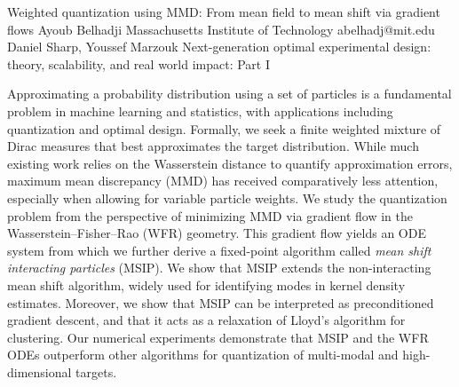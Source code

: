 \begin{talk}
  {Weighted quantization using MMD:
From mean field to mean shift via gradient flows}%
  {Ayoub Belhadji}%
  {Massachusetts Institute of Technology}%
  {abelhadj@mit.edu}%
  {Daniel Sharp, Youssef Marzouk}%
  {Next-generation optimal experimental design: theory, scalability, and real world impact: Part I}%
    
   
Approximating a probability distribution using a set of particles is a fundamental problem in machine learning and statistics, with applications including  quantization and optimal design. Formally, we seek a finite weighted mixture of Dirac measures that best approximates the target distribution. While much existing work relies on the Wasserstein distance to quantify approximation errors, maximum mean discrepancy (MMD) has received comparatively less attention, especially when allowing for variable particle weights. We study the quantization problem from the perspective of minimizing MMD via gradient flow in the Wasserstein--Fisher--Rao (WFR) geometry. This gradient flow yields an ODE system from which we further derive a fixed-point algorithm called \emph{mean shift interacting particles} (MSIP). We show that MSIP extends the non-interacting mean shift algorithm, widely used for identifying modes in kernel density estimates. Moreover, we show that MSIP can be interpreted as preconditioned gradient descent, and that it acts as a relaxation of Lloyd's algorithm for clustering. 
Our numerical experiments demonstrate that MSIP and the WFR ODEs outperform other algorithms for quantization of multi-modal and high-dimensional targets.
\medskip


\end{talk}
